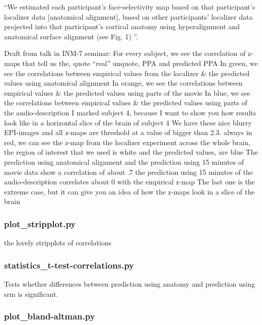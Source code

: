 ``We estimated each participant's face-selectivity map based on that
participant’s localizer data [anatomical alignment], based on other
participants' localizer data projected into that participant's cortical anatomy
using hyperalignment and anatomical surface alignment (see Fig. 1)
\citep{jiahui2020predicting}''.

%
Draft from talk in INM-7 seminar:
%
For every subject, we see the correlation of z-maps that tell us the, quote
``real'' unquote, PPA and predicted PPA
%
In green, we see the correlations between empirical values from the localizer \&
the predicted values using anatomical alignment
%
In orange, we see the correlations between empirical values \& the predicted
values using parts of the movie
%
In blue, we see the correlations between empirical values \& the predicted
values using parts of the audio-description
%
I marked subject 4, because I want to show you how results look like in a
horizontal slice of the brain of subject 4
%
We have these nice blurry EPI-images and all z-maps are threshold at a value of
bigger than 2.3.
%
always in red, we can see the z-map from the localizer experiment across the
whole brain,
%
the region of interest that we used is white and the predicted values, are blue
%
The prediction using anatomical alignment and the prediction using 15 minutes of
movie data show a correlation of about .7
%
the prediction using 15 minutes of the audio-description correlates about 0 with
the empirical z-map
%
The last one is the extreme case, but it can give you an idea of how the z-maps
look in a slice of the brain


\subsubsection{plot\_stripplot.py}

the lovely stripplots of correlations

\subsubsection{statistics\_t-test-correlations.py}

Tests whether differences between prediction using anatomy and prediction using
\ac{srm} is significant.

\subsubsection{plot\_bland-altman.py}


